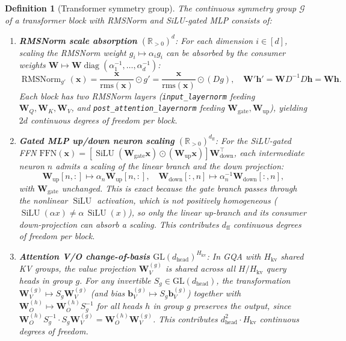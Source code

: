 \documentclass{article}
\newtheorem{definition}[theorem]{Definition}
\newcommand{\R}{\mathbb{R}}
\newcommand{\cG}{\mathcal{G}}
\newcommand{\bh}{\mathbf{h}}
\newcommand{\bx}{\mathbf{x}}
\newcommand{\bW}{\mathbf{W}}
\DeclareMathOperator{\diag}{diag}
\DeclareMathOperator{\SiLU}{SiLU}
\DeclareMathOperator{\RMSNorm}{RMSNorm}
\begin{document}
\begin{definition}[Transformer symmetry group]
\label{def:symmetry}
The continuous symmetry group $\cG$ of a transformer block with RMSNorm and SiLU-gated MLP consists of:
\begin{enumerate}
    \item \textbf{RMSNorm scale absorption} $(\R_{>0})^d$: For each dimension $i \in [d]$, scaling the RMSNorm weight $g_i \mapsto \alpha_i g_i$ can be absorbed by the consumer weights $\bW \mapsto \bW \diag(\alpha_1^{-1}, \ldots, \alpha_d^{-1})$:
    \begin{equation}\label{eq:rmsnorm-sym}
        \RMSNorm_{g'}(\bx) = \frac{\bx}{\text{rms}(\bx)} \odot g' = \frac{\bx}{\text{rms}(\bx)} \odot (D g),
        \quad \bW' \bh' = \bW D^{-1} D \bh = \bW \bh.
    \end{equation}
    Each block has two RMSNorm layers (\texttt{input\_layernorm} feeding $\bW_Q, \bW_K, \bW_V$, and \texttt{post\_attention\_layernorm} feeding $\bW_{\text{gate}}, \bW_{\text{up}}$), yielding $2d$ continuous degrees of freedom per block.

    \item \textbf{Gated MLP up/down neuron scaling} $(\R_{>0})^{d_\text{ff}}$: For the SiLU-gated FFN $\text{FFN}(\bx) = [\SiLU(\bW_{\text{gate}} \bx) \odot (\bW_{\text{up}} \bx)] \bW_{\text{down}}^\top$, each intermediate neuron $n$ admits a scaling of the \emph{linear} branch and the down projection:
    \begin{equation}\label{eq:ffn-sym}
        \bW_{\text{up}}[n,:] \mapsto \alpha_n \bW_{\text{up}}[n,:], \quad
        \bW_{\text{down}}[:,n] \mapsto \alpha_n^{-1} \bW_{\text{down}}[:,n],
    \end{equation}
    with $\bW_{\text{gate}}$ unchanged.  This is exact because the gate branch passes through the nonlinear $\SiLU$ activation, which is \emph{not} positively homogeneous ($\SiLU(\alpha x) \neq \alpha\,\SiLU(x)$), so only the linear up-branch and its consumer down-projection can absorb a scaling.
    This contributes $d_\text{ff}$ continuous degrees of freedom per block.

    \item \textbf{Attention V/O change-of-basis} $\mathrm{GL}(d_\text{head})^{H_{\text{kv}}}$: In GQA with $H_{\text{kv}}$ shared KV groups, the value projection $\bW_V^{(g)}$ is shared across all $H/H_{\text{kv}}$ query heads in group $g$.  For any invertible $S_g \in \mathrm{GL}(d_\text{head})$, the transformation $\bW_V^{(g)} \mapsto S_g \bW_V^{(g)}$ (and bias $\mathbf{b}_V^{(g)} \mapsto S_g \mathbf{b}_V^{(g)}$) together with $\bW_O^{(h)} \mapsto \bW_O^{(h)} S_g^{-1}$ for all heads $h$ in group $g$ preserves the output, since $\bW_O^{(h)} S_g^{-1} \cdot S_g \bW_V^{(g)} = \bW_O^{(h)} \bW_V^{(g)}$.  This contributes $d_\text{head}^2 \cdot H_{\text{kv}}$ continuous degrees of freedom.


\end{enumerate}
\end{definition}
\end{document}
